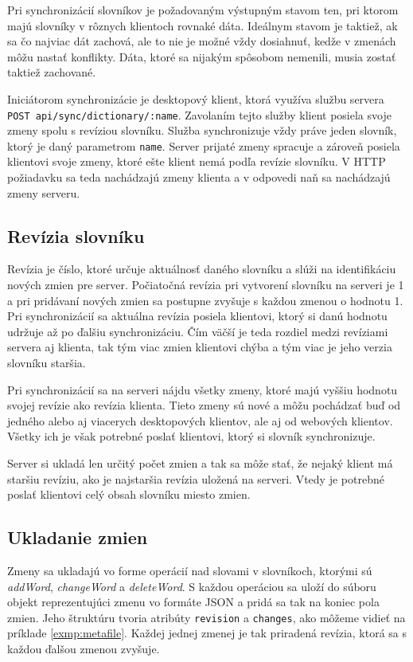 \documentclass[
  digital, %
  table,   %
  lof,     %
  lot,     %
]{fithesis3}
\begin{document}
Pri synchronizácií slovníkov je požadovaným výstupným stavom ten, pri ktorom majú slovníky v rôznych klientoch rovnaké dáta. Ideálnym stavom je taktiež, ak sa čo najviac dát zachová, ale to nie je možné vždy dosiahnuť, kedže v zmenách môžu nastať konflikty. Dáta, ktoré sa nijakým spôsobom nemenili, musia zostať taktiež zachované.

Iniciátorom synchronizácie je desktopový klient, ktorá využíva službu servera \texttt{POST api/sync/dictionary/:name}. Zavolaním tejto služby klient posiela svoje zmeny spolu s revíziou slovníku. Služba synchronizuje vždy práve jeden slovník, ktorý je daný parametrom \texttt{name}. Server prijaté zmeny spracuje a zároveň posiela klientovi svoje zmeny, ktoré ešte klient nemá podľa revízie slovníku. V HTTP požiadavku sa teda nachádzajú zmeny klienta a v odpovedi naň sa nachádzajú zmeny serveru.

\subsection{Revízia slovníku}
Revízia je číslo, ktoré určuje aktuálnosť daného slovníku a slúži na identifikáciu nových zmien pre server. Počiatočná revízia pri vytvorení slovníku na serveri je 1 a pri pridávaní nových zmien sa postupne zvyšuje s každou zmenou o hodnotu 1. Pri synchronizácií sa aktuálna revízia posiela klientovi, ktorý si danú hodnotu udržuje až po ďalšiu synchronizáciu. Čím väčší je teda rozdiel medzi revíziami servera aj klienta, tak tým viac zmien klientovi chýba a tým viac je jeho verzia slovníku staršia.

Pri synchronizácií sa na serveri nájdu všetky zmeny, ktoré majú vyššiu hodnotu svojej revízie ako revízia klienta. Tieto zmeny sú nové a môžu pochádzať buď od jedného alebo aj viacerych desktopových klientov, ale aj od webových klientov. Všetky ich je však potrebné poslať klientovi, ktorý si slovník synchronizuje.

Server si ukladá len určitý počet zmien a tak sa môže stať, že nejaký klient má staršiu revíziu, ako je najstaršia revízia uložená na serveri. Vtedy je potrebné poslať klientovi celý obsah slovníku miesto zmien.

\subsection{Ukladanie zmien}
Zmeny sa ukladajú vo forme operácií nad slovami v slovníkoch, ktorými sú \textit{addWord}, \textit{changeWord} a \textit{deleteWord}. S každou operáciou sa uloží do súboru objekt reprezentujúci zmenu vo formáte JSON a pridá sa tak na koniec pola zmien. Jeho štruktúru tvoria atribúty \texttt{revision} a \texttt{changes}, ako môžeme vidieť na príklade \ref{exmp:metafile}. Každej jednej zmenej je tak priradená revízia, ktorá sa s každou ďalšou zmenou zvyšuje.
\end{document}
